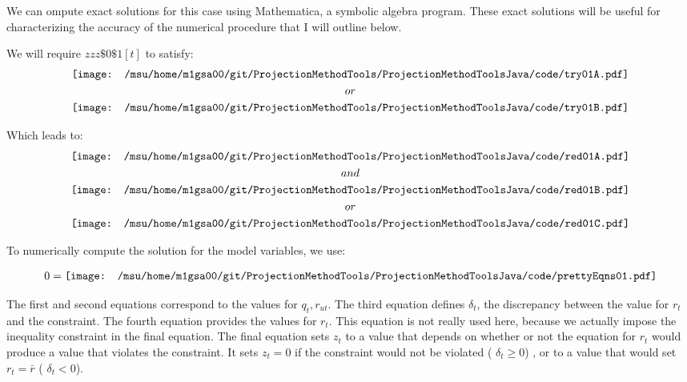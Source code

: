 We can ompute exact solutions for this case using
Mathematica, a symbolic algebra program.  These exact 
solutions will be useful for
characterizing the accuracy of the numerical procedure that I will outline
below.

We will require $zzz\$0\$1[t]$ to satisfy:
 \begin{gather*}
\vcenter{\hbox{\texttt{[image: /msu/home/m1gsa00/git/ProjectionMethodTools/ProjectionMethodToolsJava/code/try01A.pdf]}}}\\
or\\
\vcenter{\hbox{\texttt{[image: /msu/home/m1gsa00/git/ProjectionMethodTools/ProjectionMethodToolsJava/code/try01B.pdf]}}}\\
 \end{gather*}


Which leads to:
 \begin{gather*}
\vcenter{\hbox{\texttt{[image: /msu/home/m1gsa00/git/ProjectionMethodTools/ProjectionMethodToolsJava/code/red01A.pdf]}}}\\
and\\
\vcenter{\hbox{\texttt{[image: /msu/home/m1gsa00/git/ProjectionMethodTools/ProjectionMethodToolsJava/code/red01B.pdf]}}}\\
or\\
\vcenter{\hbox{\texttt{[image: /msu/home/m1gsa00/git/ProjectionMethodTools/ProjectionMethodToolsJava/code/red01C.pdf]}}}
 \end{gather*}



To numerically compute the solution for the model variables, we use:

\begin{gather*}
  0=\vcenter{\hbox{\texttt{[image: /msu/home/m1gsa00/git/ProjectionMethodTools/ProjectionMethodToolsJava/code/prettyEqns01.pdf]}}}
\end{gather*}

The first and second equations correspond to the values for $q_t,r_{ut}$.
The third equation defines $\delta_t$, the discrepancy between the value for $r_t$ and the constraint.    The fourth equation provides the values for $r_t$.  This equation is not really used here, because we actually impose the inequality
constraint in the final equation. The final equation
 sets $z_t$ to a value that depends on 
whether or not the equation for $r_t$ would produce a value that violates the
constraint.  It sets $z_t=0$ if the constraint would  not be violated ( $\delta_t\ge0$) ,  or
to a value that would set $r_t=\bar{r}$ ( $\delta_t<0$).



